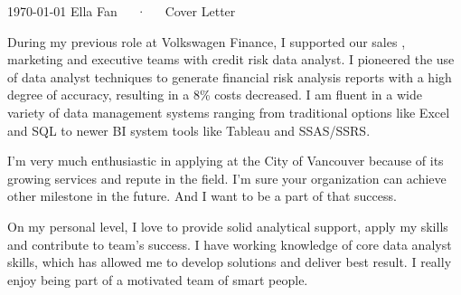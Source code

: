 \documentclass[11pt, a4paper]{awesome-cv}
\begin{document}
\makecvheader[R]

\makecvfooter
  {\today}
  {Ella Fan~~~·~~~Cover Letter}
  {}

\makelettertitle

\begin{cvletter}

During my previous role at Volkswagen Finance, I supported our sales , marketing and executive teams with credit risk data analyst. I pioneered the use of data analyst techniques to generate financial risk analysis reports with a high degree of accuracy, resulting in a 8\% costs decreased. I am fluent in a wide variety of data management systems ranging from traditional options like Excel and SQL to newer BI system tools like Tableau and SSAS/SSRS.

I'm very much enthusiastic in applying at the City of Vancouver because of its growing services and repute in the field. I'm sure your organization can achieve other milestone in the future. And I want to be a part of that success.

On my personal level, I love to provide solid analytical support, apply my skills and contribute to team's success. I have working knowledge of core data analyst skills, which has allowed me to develop solutions and deliver best result. I really enjoy being part of a motivated team of smart people.

\end{cvletter}


\makeletterclosing
\end{document}
